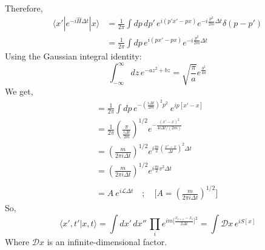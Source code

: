 \documentclass[14pt]{article} %
\begin{document}
Therefore,
\begin{align*}
\langle x' | e^{-i \hat{H} \Delta t} | x \rangle &= \frac{1}{2\pi} \int dp \, dp' \, e^{i(p' x' - p x)} e^{-i \frac{p^2}{2m} \Delta t} \delta(p - p') \\
&= \frac{1}{2\pi} \int dp \, e^{i (p x' - px)} e^{-i \frac{p^2}{2m} \Delta t}
\end{align*}
Using the Gaussian integral identity:
\[
\int_{-\infty}^{\infty} dz \, e^{-a z^2 + b z} = \sqrt{\frac{\pi}{a}} e^{\frac{b^2}{4a}}
\]
We get,
\begin{align*}
&= \frac{1}{2\pi} \int dp \,e^{- {(\frac{i \Delta t}{2m})}^2 p^2} ~ e^{ ip [ x' -x ] } \\
&= \frac{1}{2\pi} \left( \frac{\pi}{\frac{i \Delta t}{2m}} \right)^{1/2} 
e^{- \frac{(x' - x)^2}{4 i \Delta t / (2m)}} \\
&= \left( \frac{m}{2 \pi i \Delta t} \right)^{1/2} 
e^{i \frac{m}{2} {\left( \frac{x' - x}{\Delta t} \right)}^2 \Delta t} \\
&= \left( \frac{m}{2 \pi i \Delta t} \right)^{1/2} 
e^{i \frac{m}{2} v^2 \Delta t} \\\\
&= A ~ e^{ i \mathcal{L} \Delta t } \quad ; \quad \big[ A= \left( \frac{m}{2 \pi i \Delta t} \right)^{1/2} \big] \quad
\end{align*}
So,
\[
\langle x', t' | x, t \rangle = \int dx'\,dx'' \, \prod_i e^{{i m \big[\frac{x_{i+1} - x_i}{2 \Delta t}}\big]^2} = \int \mathcal{D}x \, e^{i S[x]}
\]
Where $\mathcal{D}x$ is an infinite-dimensional factor.




\end{document}
